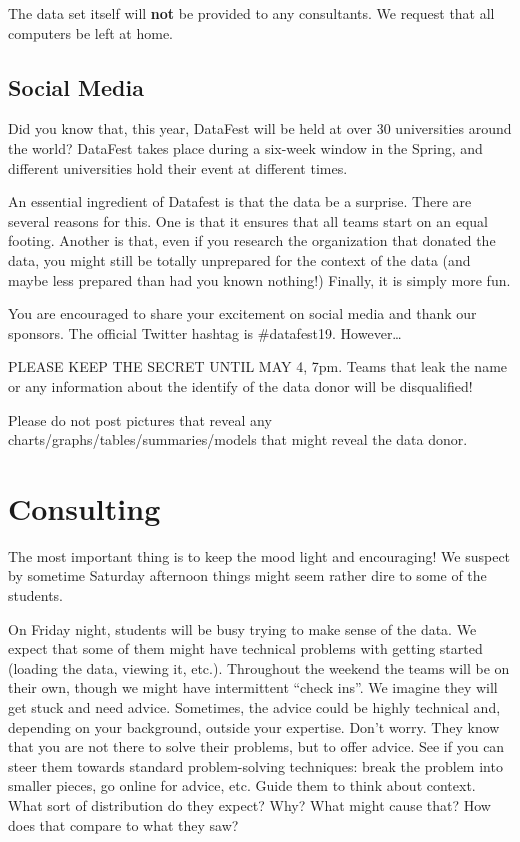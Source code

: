 \documentclass[]{article}
\begin{document}
The data set itself will \textbf{not} be provided to any consultants.
{We request that all computers be left at home.}

\hypertarget{social-media}{%
\subsection{Social Media}\label{social-media}}

Did you know that, this year, DataFest will be held at over 30
universities around the world? DataFest takes place during a six-week
window in the Spring, and different universities hold their event at
different times.

An essential ingredient of Datafest is that the data be a surprise.
There are several reasons for this. One is that it ensures that all
teams start on an equal footing. Another is that, even if you research
the organization that donated the data, you might still be totally
unprepared for the context of the data (and maybe less prepared than had
you known nothing!) Finally, it is simply more fun.

You are encouraged to share your excitement on social media and thank
our sponsors. The official Twitter hashtag is \#datafest19.
However\ldots{}

PLEASE KEEP THE SECRET UNTIL MAY 4, 7pm. Teams that leak the name or any
information about the identify of the data donor will be disqualified!

Please do not post pictures that reveal any
charts/graphs/tables/summaries/models that might reveal the data donor.

\hypertarget{consulting}{%
\section{Consulting}\label{consulting}}

The most important thing is to keep the mood light and encouraging! We
suspect by sometime Saturday afternoon things might seem rather dire to
some of the students.

On Friday night, students will be busy trying to make sense of the data.
We expect that some of them might have technical problems with getting
started (loading the data, viewing it, etc.). Throughout the weekend the
teams will be on their own, though we might have intermittent ``check
ins''. We imagine they will get stuck and need advice. Sometimes, the
advice could be highly technical and, depending on your background,
outside your expertise. Don't worry. They know that you are not there to
solve their problems, but to offer advice. See if you can steer them
towards standard problem-solving techniques: break the problem into
smaller pieces, go online for advice, etc. Guide them to think about
context. What sort of distribution do they expect? Why? What might cause
that? How does that compare to what they saw?
\end{document}
